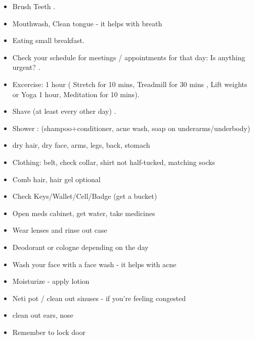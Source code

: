 \begin{itemize}
\tiny \item \tiny Brush Teeth .
\item \tiny Mouthwash, Clean tongue - it helps with breath
\item \tiny Eating small breakfast.
\item \tiny Check your schedule for meetings / appointments for that
day: Is anything urgent? .
\item \tiny Excercise: 1 hour ( Stretch for 10 mins, Treadmill for 30
mins , Lift weights or Yoga 1 hour, Meditation for 10 mins).
\item \tiny Shave (at least every other day) .
\item \tiny Shower : (shampoo+conditioner, acne wash,  soap on
underarms/underbody) 
\item \tiny dry hair, dry face, arms, legs, back, stomach 
\item \tiny Clothing: belt, check collar, shirt not half-tucked,
matching socks 
\item \tiny Comb hair, hair gel optional 
\item \tiny Check Keys/Wallet/Cell/Badge (get a bucket) 
\item \tiny Open meds cabinet, get water, take medicines 
\item \tiny Wear lenses and rinse out case 
\item \tiny Deodorant or cologne depending on the day 
\item \tiny Wash your face with a face wash - it helps with
acne 
\item \tiny Moisturize - apply lotion 
\item \tiny Neti pot / clean out sinuses - if you’re feeling
congested 
\item \tiny clean out ears, nose 
\item \tiny Remember to lock door 
\end{itemize}

